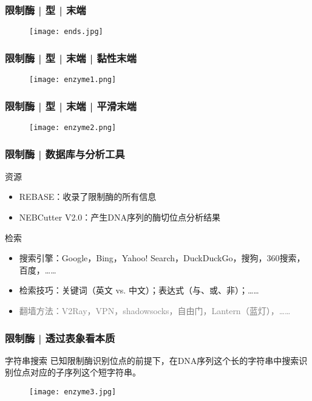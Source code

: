 \begin{frame}
  \frametitle{限制酶 | 型 | 末端}
  \begin{figure}
    \centering
    \texttt{[image: ends.jpg]}
  \end{figure}
\end{frame}

\begin{frame}
  \frametitle{限制酶 | 型 | 末端 | 黏性末端}
  \begin{figure}
    \centering
    \texttt{[image: enzyme1.png]}
  \end{figure}
\end{frame}

\begin{frame}
  \frametitle{限制酶 | 型 | 末端 | 平滑末端}
  \begin{figure}
    \centering
    \texttt{[image: enzyme2.png]}
  \end{figure}
\end{frame}

\begin{frame}
  \frametitle{限制酶 | 数据库与分析工具}
  \begin{block}{资源}
  \begin{itemize}
    \item REBASE：收录了限制酶的所有信息
    \item NEBCutter V2.0：产生DNA序列的酶切位点分析结果
  \end{itemize}
  \end{block}
  \pause
  \begin{block}{检索}
    \begin{itemize}
      \item 搜索引擎：Google，Bing，Yahoo! Search，DuckDuckGo，搜狗，360搜索，百度，……
      \item 检索技巧：关键词（英文 vs. 中文）；表达式（与、或、非）；……
      \item \textcolor{gray}{翻墙方法：V2Ray，VPN，shadowsocks，自由门，Lantern（蓝灯），……}
    \end{itemize}
  \end{block}
\end{frame}

\begin{frame}
  \frametitle{限制酶 | 透过表象看本质}
  \begin{block}{字符串搜索}
    已知限制酶识别位点的前提下，在DNA序列这个长的字符串中搜索识别位点对应的子序列这个短字符串。
  \end{block}
  \begin{figure}
    \centering
    \texttt{[image: enzyme3.jpg]}
  \end{figure}
\end{frame}

